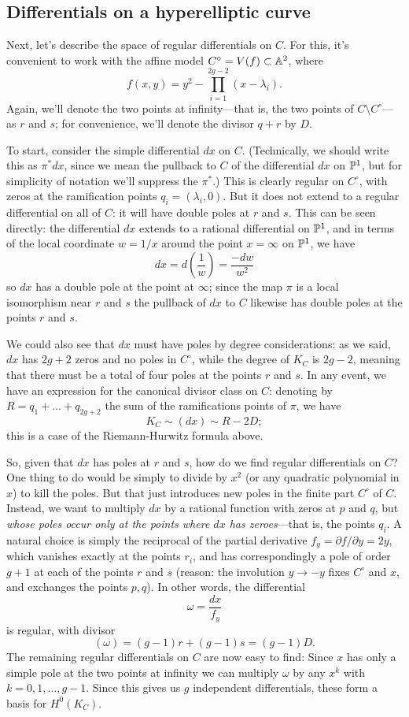   
  \subsection{Differentials on a hyperelliptic curve}

Next, let's describe the space of regular differentials on $C$. For this, it's convenient to work with the affine model $C^\circ = V(f) \subset \AA^2$, where
$$
f(x,y) = y^2 - \prod_{i=1}^{2g-2} (x - \lambda_i).
$$
Again, we'll denote the two points at infinity---that is, the two points of $C \setminus C^\circ$---as $r$ and $s$; for convenience, we'll denote the divisor $q+r$ by $D$.

To start, consider the simple differential $dx$ on $C$. (Technically, we should write this as $\pi^*dx$, since we mean the pullback to $C$ of the differential $dx$ on $\PP^1$, but for simplicity of notation we'll suppress the $\pi^*$.)  This is clearly regular on $C^\circ$, with zeros at the ramification points $q_i = (\lambda_i, 0)$. But it does not extend to a regular differential on all of $C$: it will have double poles at $r$ and $s$.  This can be seen directly: the differential $dx$ extends to a rational differential on $\PP^1$, and in terms of the local coordinate $w = 1/x$ around the point $x = \infty$ on $\PP^1$, we have
$$
dx = d\left(\frac{1}{w}\right) = \frac{-dw}{w^2}
$$
so $dx$ has a double pole at the point at $\infty$; since the map $\pi$ is a local isomorphism near $r$ and $s$ the pullback of $dx$ to $C$ likewise has double poles at the points $r$ and $s$.


We could also see that $dx$ must have poles by degree considerations: as we said, $dx$ has $2g+2$ zeros and no poles in $C^\circ$, while the degree of $K_C$ is $2g-2$, meaning that there must be  a total of four poles at the points $r$ and $s$. In any event, we have an expression for the canonical divisor class on $C$: denoting by $R = q_1 + \dots + q_{2g+2}$ the sum of the ramifications points of $\pi$, we have
$$
K_C \sim (dx) \sim R - 2D;
$$
this is a case of the Riemann-Hurwitz formula above.

So, given that $dx$ has poles at $r$ and $s$, how do we find regular differentials on $C$? One thing to do would be simply to divide by $x^2$ (or any quadratic polynomial in $x$) to kill the poles. But that just introduces new poles in the finite part $C^\circ$ of $C$. Instead, we want to multiply $dx$ by a rational function with zeros at $p$ and $q$, but \emph{whose poles occur only at the points where $dx$ has zeroes}---that is, the points $q_i$.  A natural choice is simply the reciprocal of the partial derivative $f_y = \partial f/ \partial y = 2y$, which vanishes exactly at the points $r_i$, and has correspondingly a pole of order $g+1$ at each of the points $r$ and $s$ (reason: the involution $y\to -y$ fixes $C^\circ$ and $x$, and exchanges the points $p,q$). In other words, the differential
$$
\omega = \frac{dx}{f_y}
$$
is regular, with divisor
$$
(\omega) = (g-1)r + (g-1)s = (g-1)D.
$$
The remaining regular differentials on $C$ are now easy to find: Since $x$ has only a simple pole
at the two points at infinity we can  multiply $\omega$ by any $x^k$ with $k = 0, 1, \dots, g-1$. Since this gives us $g$ independent differentials, these  form a basis for $H^0(K_C)$.

